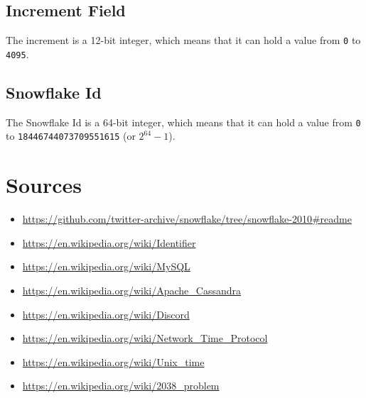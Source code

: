 \documentclass{article}
\newcommand{\code}[1]{\colorbox{cverbbg}{\texttt{#1}}}
\begin{document}
\subsection{Increment Field}
The increment is a 12-bit integer, which means that it can hold a value from
\code{0} to \code{4095}.

\subsection{Snowflake Id}
\label{snowflake_id_constraints}
The Snowflake Id is a 64-bit integer, which means that it can hold a value from
\code{0} to \code{18446744073709551615} (or $2^{64} - 1$).

\section{Sources}
\begin{small}
	\begin{itemize}
		\item

		      \url{https://github.com/twitter-archive/snowflake/tree/snowflake-2010#readme}
		\item \url{https://en.wikipedia.org/wiki/Identifier}
		\item \url{https://en.wikipedia.org/wiki/MySQL}
		\item \url{https://en.wikipedia.org/wiki/Apache_Cassandra}
		\item \url{https://en.wikipedia.org/wiki/Discord}
		\item \url{https://en.wikipedia.org/wiki/Network_Time_Protocol}
		\item \url{https://en.wikipedia.org/wiki/Unix_time}
		\item \url{https://en.wikipedia.org/wiki/2038_problem}
	\end{itemize}
\end{small}
\end{document}
